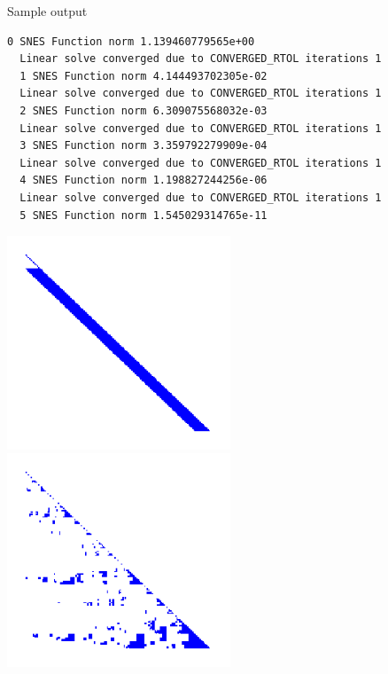 \begin{frame}[fragile]{Sample output}
\begin{Verbatim}[formatcom=\footnotesize]
  0 SNES Function norm 1.139460779565e+00 
  Linear solve converged due to CONVERGED_RTOL iterations 1
  1 SNES Function norm 4.144493702305e-02 
  Linear solve converged due to CONVERGED_RTOL iterations 1
  2 SNES Function norm 6.309075568032e-03 
  Linear solve converged due to CONVERGED_RTOL iterations 1
  3 SNES Function norm 3.359792279909e-04 
  Linear solve converged due to CONVERGED_RTOL iterations 1
  4 SNES Function norm 1.198827244256e-06 
  Linear solve converged due to CONVERGED_RTOL iterations 1
  5 SNES Function norm 1.545029314765e-11 
\end{Verbatim}
\vspace{-1em}
\includegraphics[width=0.5\textwidth]{figures/Ex5NaturalFill}
\includegraphics[width=0.5\textwidth]{figures/Ex5NDFill}
\end{frame}


